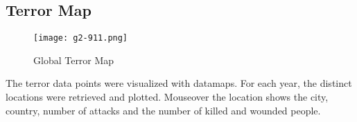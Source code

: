 \subsection{Terror Map}

\begin{figure}[hbt!]
	\centering
	\texttt{[image: g2-911.png]}
	\caption{Global Terror Map}
\end{figure}
The terror data points were visualized with datamaps. For each year, the distinct locations were retrieved and plotted. Mouseover the location shows the city, country, number of attacks and the number of killed and wounded people.